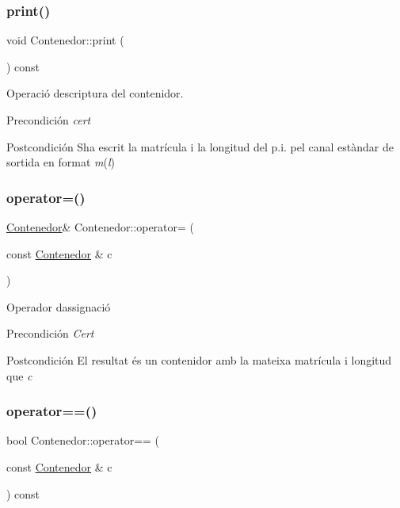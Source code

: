 \subsubsection{\texorpdfstring{print()}{print()}}
{\footnotesize\ttfamily void Contenedor\+::print (\begin{DoxyParamCaption}{ }\end{DoxyParamCaption}) const}



Operació d\textquotesingle{}escriptura del contenidor. 

\begin{DoxyPrecond}{Precondición}
{\itshape cert} 
\end{DoxyPrecond}
\begin{DoxyPostcond}{Postcondición}
S\textquotesingle{}ha escrit la matrícula i la longitud del p.\+i. pel canal estàndar de sortida en format {\itshape m}({\itshape l}) 
\end{DoxyPostcond}
\mbox{\label{class_contenedor_a4653bad34c7ff84820bf210306151be6}} 
\subsubsection{\texorpdfstring{operator=()}{operator=()}}
{\footnotesize\ttfamily \hyperlink{class_contenedor}{Contenedor}\& Contenedor\+::operator= (\begin{DoxyParamCaption}\item[{const \hyperlink{class_contenedor}{Contenedor} \&}]{c }\end{DoxyParamCaption})}



Operador d\textquotesingle{}assignació 

\begin{DoxyPrecond}{Precondición}
{\itshape Cert} 
\end{DoxyPrecond}
\begin{DoxyPostcond}{Postcondición}
El resultat és un contenidor amb la mateixa matrícula i longitud que {\itshape c} 
\end{DoxyPostcond}
\mbox{\label{class_contenedor_affecade7507a978e3abb5eea331a509e}} 
\subsubsection{\texorpdfstring{operator==()}{operator==()}}
{\footnotesize\ttfamily bool Contenedor\+::operator== (\begin{DoxyParamCaption}\item[{const \hyperlink{class_contenedor}{Contenedor} \&}]{c }\end{DoxyParamCaption}) const}



